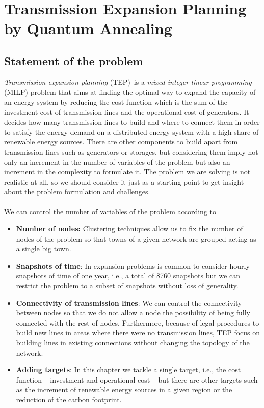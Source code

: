 \chapter{Transmission Expansion Planning by Quantum Annealing} %
\label{Chapter4} %
\section{Statement of the problem}
\textit{Transmission expansion planning} (TEP)\,\cite{Neumann2020TransmissionFlows} is a \textit{mixed integer linear programming} (MILP) problem that aims at finding the optimal way to expand the capacity of an energy system by reducing the cost function which is the sum of the investment cost of transmission lines and the operational cost of generators. It decides how many transmission lines to build and where to connect them in order to satisfy the energy demand on a distributed energy system with a high share of renewable energy sources. There are other components to build apart from transmission lines such as generators or storages, but considering them imply not only an increment in the number of variables of the problem but also an increment in the complexity to formulate it. The problem we are solving is not realistic at all, so we should consider it just as a starting point to get insight about the problem formulation and challenges.\\\\
We can control the number of variables of the problem according to
\begin{itemize}
    \item \textbf{Number of nodes:} Clustering techniques allow us to fix the number of nodes of the problem so that towns of a given network are grouped acting as a single big town.
    \item \textbf{Snapshots of time}: In expansion problems is common to consider hourly snapshots of time of one year, i.e., a total of 8760 snapshots but we can restrict the problem to a subset of snapshots without loss of generality.
    \item \textbf{Connectivity of transmission lines}: We can control the connectivity between nodes so that we do not allow a node the possibility of being fully connected with the rest of nodes. Furthermore, because of legal procedures to build new lines in areas where there were no transmission lines, TEP focus on building lines in existing connections without changing the topology of the network.
    \item \textbf{Adding targets}: In this chapter we tackle a single target, i.e., the cost function -- investment and operational cost -- but there are other targets such as the increment of renewable energy sources in a given region or the reduction of the carbon footprint.
\end{itemize}
